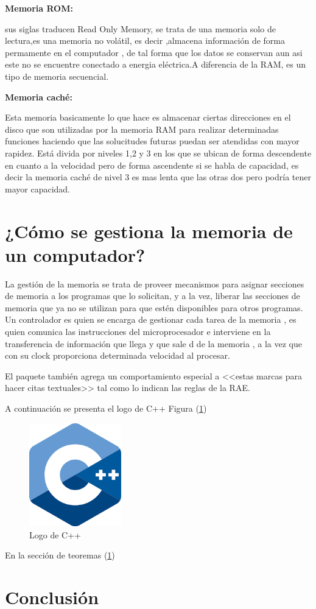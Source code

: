 \documentclass{article}
\begin{document}
\textbf{Memoria ROM:}

sus siglas traducen Read Only Memory, se trata de una memoria solo de lectura,es una memoria no volátil, es decir ,almacena información de forma permamente en el
computador , de tal forma que los datos se conservan aun asi este no se encuentre conectado a energia eléctrica.A diferencia de la RAM, es un tipo de memoria secuencial.  

\textbf{Memoria caché:}

Esta memoria basicamente lo que hace es almacenar ciertas direcciones en el disco que son utilizadas por la memoria RAM para realizar determinadas funciones haciendo que las solucitudes futuras puedan ser atendidas con mayor rapidez. Está divida por niveles 1,2 y 3 en los que se ubican de forma descendente en cuanto a la velocidad pero de forma ascendente si se habla de capacidad, es decir la memoria caché de nivel 3 es mas lenta que las otras dos pero podría tener mayor capacidad.

\section{¿Cómo se gestiona la memoria de un computador?} \label{contenido}
La gestión de la memoria se trata de proveer mecanismos para asignar secciones de memoria a los programas que lo solicitan,  y a la vez, liberar las secciones de memoria
que ya no se utilizan para que estén disponibles para otros programas. Un controlador es quien se encarga de gestionar cada tarea de la memoria , es quien comunica las instrucciones del microprocesador e interviene en la transferencia de información que llega y que sale d
de la memoria , a la vez que con su clock proporciona determinada velocidad al procesar.

El paquete también agrega un comportamiento especial 
a <<estas marcas para hacer citas textuales>> tal como 
lo indican las reglas de la RAE. \cite{dirac}
\cite{knuthwebsite}



A continuación se presenta el logo de C++ Figura (\ref{fig:cpplogo})

\begin{figure}[h]
\includegraphics[width=4cm]{cpplogo.png}
\centering
\caption{Logo de C++}
\label{fig:cpplogo}
\end{figure}

En la sección de teoremas (\ref{contenido})

\section{Conclusión} \label{conclulsion}



\end{document}

